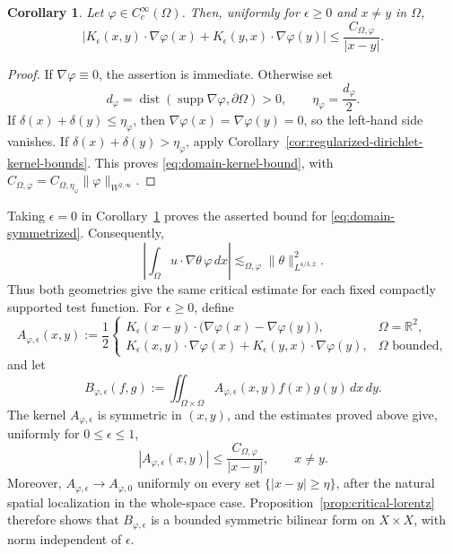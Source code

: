 \documentclass[11pt,reqno]{amsproc}
\newtheorem{corollary}{Corollary}[section]
\newcommand{\R}{\mathbb R}
\newcommand{\Om}{\Omega}
\newcommand{\dist}{\operatorname{dist}}
\newcommand{\supp}{\operatorname{supp}}
\newcommand{\dd}{\,d}
\begin{document}
\begin{corollary}
\label{lem:uniform-paired-dirichlet-kernel}
Let $\varphi\in C_c^\infty(\Om)$.  Then, uniformly for $\epsilon\geq0$ and
$x\neq y$ in $\Om$,
\begin{equation}\label{eq:domain-kernel-bound}
 \left|K_\epsilon(x,y)\cdot\nabla\varphi(x)
 +K_\epsilon(y,x)\cdot\nabla\varphi(y)\right|
 \leq \frac{C_{\Om,\varphi}}{|x-y|}.
\end{equation}
\end{corollary}

\begin{proof}
If $\nabla\varphi\equiv0$, the assertion is immediate.  Otherwise set
\[
 d_\varphi=\dist(\supp\nabla\varphi,\partial\Om)>0,
 \qquad \eta_\varphi=\frac{d_\varphi}{2}.
\]
If $\delta(x)+\delta(y)\leq\eta_\varphi$, then
$\nabla\varphi(x)=\nabla\varphi(y)=0$, so the left-hand side vanishes.  If
$\delta(x)+\delta(y)>\eta_\varphi$, apply
Corollary~\ref{cor:regularized-dirichlet-kernel-bounds}.  This proves
\eqref{eq:domain-kernel-bound}, with
$C_{\Om,\varphi}=C_{\Om,\eta_\varphi}
\|\varphi\|_{W^{2,\infty}}$.
\end{proof}

Taking $\epsilon=0$ in
Corollary~\ref{lem:uniform-paired-dirichlet-kernel}
proves the asserted bound for \eqref{eq:domain-symmetrized}.  Consequently,
\begin{equation}\label{eq:time-bound-domain}
  \left|\int_\Om u\cdot\nabla\theta\,\varphi\dd x\right|
  \lesssim_{\Om,\varphi}
  \|\theta\|_{L^{4/3,2}}^2.
\end{equation}
Thus both geometries give the same critical estimate for each fixed compactly
supported test function.  For $\epsilon\geq0$, define
\[
 A_{\varphi,\epsilon}(x,y)
 :=\frac12
 \begin{cases}
 K_\epsilon(x-y)\cdot
 \bigl(\nabla\varphi(x)-\nabla\varphi(y)\bigr),
 &\Om=\R^2,\\[1mm]
 K_\epsilon(x,y)\cdot\nabla\varphi(x)
 +K_\epsilon(y,x)\cdot\nabla\varphi(y),
 &\Om\text{ bounded},
 \end{cases}
\]
and let
\begin{equation}\label{eq:regularized-symmetrized-form}
 B_{\varphi,\epsilon}(f,g)
 :=\iint_{\Om\times\Om}
 A_{\varphi,\epsilon}(x,y)f(x)g(y)\dd x\dd y.
\end{equation}
The kernel $A_{\varphi,\epsilon}$ is symmetric in $(x,y)$, and the estimates
proved above give, uniformly for $0\leq\epsilon\leq1$,
\begin{equation}\label{eq:A-bound}
 |A_{\varphi,\epsilon}(x,y)|
 \leq \frac{C_{\Om,\varphi}}{|x-y|},
 \qquad x\neq y.
\end{equation}
Moreover, $A_{\varphi,\epsilon}\to A_{\varphi,0}$ uniformly on every set
$\{|x-y|\geq\eta\}$, after the natural spatial localization in the
whole-space case.  Proposition~\ref{prop:critical-lorentz} therefore shows
that $B_{\varphi,\epsilon}$ is a bounded symmetric bilinear form on
$X\times X$, with norm independent of $\epsilon$.
\end{document}
